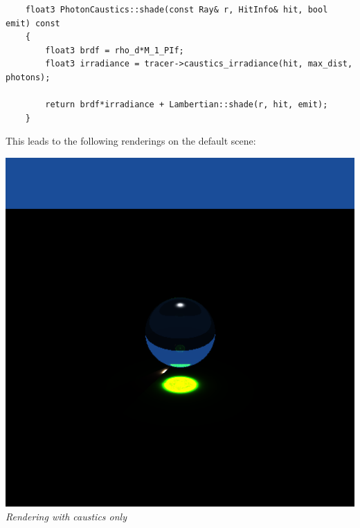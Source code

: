 \documentclass[a4,12pt]{article}
\begin{document}
	\begin{lstlisting}
	float3 PhotonCaustics::shade(const Ray& r, HitInfo& hit, bool emit) const
	{
		float3 brdf = rho_d*M_1_PIf;
		float3 irradiance = tracer->caustics_irradiance(hit, max_dist, photons);
		
		return brdf*irradiance + Lambertian::shade(r, hit, emit);
	}
	\end{lstlisting}
	
	This leads to the following renderings on the default scene:
	
	\begin{center}
		\begin{minipage}[b]{0.40\linewidth}
			\begin{center}
				\includegraphics[width = \textwidth]{./Worksheet6/causticsrender.png}\\
				\textit{Rendering with caustics only}\\
				\vspace{1em}
			\end{center}
		\end{minipage}
		\hspace{0.05\linewidth}
		\begin{minipage}[b]{0.40\linewidth}
			\begin{center}

\end{center}
\end{minipage}
\end{center}
\end{document}
